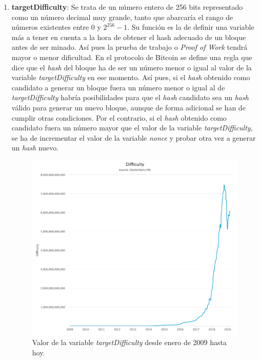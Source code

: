 \documentclass{article}
\begin{document}
\begin{enumerate}
\begin{verbatim}
    printf("Timestamp epoch: %ld\n", (long) tod);
}
        \end{verbatim}
        
    
        \item \textbf{targetDifficulty}: Se trata de un número entero de 256 bits representado como un número decimal muy grande, tanto que abarcaría el rango de números existentes entre $0$ y $2^{256}-1$. Su función es la de definir una variable más a tener en cuenta a la hora de obtener el hash adecuado de un bloque antes de ser minado. Así pues la prueba de trabajo o \textit{Proof of Work} tendrá mayor o menor dificultad. En el protocolo de Bitcoin se define una regla que dice que el \textit{hash} del bloque ha de ser un número menor o igual al valor de la variable \textit{targetDifficulty} en ese momento. Así pues, si el \textit{hash} obtenido como candidato a generar un bloque fuera un número menor o igual al de \textit{targetDifficulty} habría posibilidades para que el \textit{hash} candidato sea un \textit{hash} válido para generar un nuevo bloque, aunque de forma adicional se han de cumplir otras condiciones. Por el contrario, si el \textit{hash} obtenido como candidato fuera un número mayor que el valor de la variable \textit{targetDifficulty}, se ha de incrementar el valor de la variable \textit{nonce} y probar otra vez a generar un \textit{hash} nuevo.
        
        \begin{figure}[H]
        \centering
            \includegraphics[scale=0.39]{img/Bitcoin_TargetDifficulty.png}
            \caption{Valor de la variable \textit{targetDifficulty} desde enero de 2009 hasta hoy.}
        \end{figure}
        

\end{enumerate}
\end{document}
